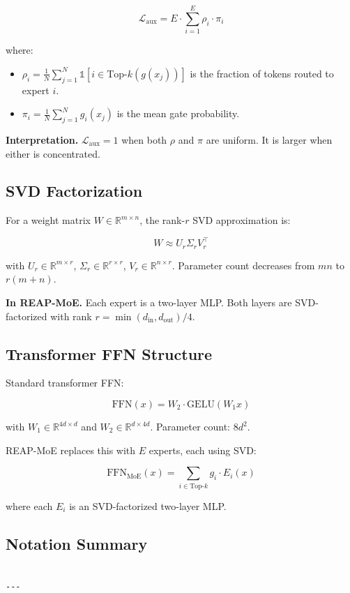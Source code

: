 \[
\mathcal{L}_\text{aux} = E \cdot \sum_{i=1}^{E} \rho_i \cdot \pi_i
\tag{3.5}
\]

where:
\begin{itemize}
\item $\rho_i = \frac{1}{N} \sum_{j=1}^{N} \mathbb{1}[i \in \text{Top-}k(g(x_j))]$ is
  the fraction of tokens routed to expert $i$.
\item $\pi_i = \frac{1}{N} \sum_{j=1}^{N} g_i(x_j)$ is the mean gate probability.

\end{itemize}
\textbf{Interpretation.} $\mathcal{L}_\text{aux} = 1$ when both $\rho$ and $\pi$ are 
uniform. It is larger when either is concentrated.

\subsection{SVD Factorization}

For a weight matrix $W \in \mathbb{R}^{m \times n}$, the rank-$r$ SVD 
approximation is:

\[
W \approx U_r \Sigma_r V_r^\top
\tag{3.6}
\]

with $U_r \in \mathbb{R}^{m \times r}$, $\Sigma_r \in \mathbb{R}^{r \times r}$, 
$V_r \in \mathbb{R}^{n \times r}$. Parameter count decreases from $mn$ to 
$r(m + n)$.

\textbf{In REAP-MoE.} Each expert is a two-layer MLP. Both layers are SVD-factorized 
with rank $r = \min(d_\text{in}, d_\text{out}) / 4$.

\subsection{Transformer FFN Structure}

Standard transformer FFN:

\[
\text{FFN}(x) = W_2 \cdot \text{GELU}(W_1 x)
\tag{3.7}
\]

with $W_1 \in \mathbb{R}^{4d \times d}$ and $W_2 \in \mathbb{R}^{d \times 4d}$. 
Parameter count: $8d^2$.

REAP-MoE replaces this with $E$ experts, each using SVD:

\[
\text{FFN}_\text{MoE}(x) = \sum_{i \in \text{Top-}k} g_i \cdot E_i(x)
\tag{3.8}
\]

where each $E_i$ is an SVD-factorized two-layer MLP.

\subsection{Notation Summary}

\begin{lstlisting}

---
\end{lstlisting}